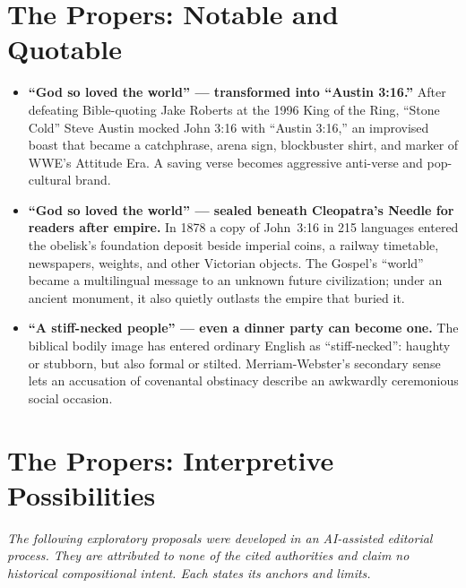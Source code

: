\section*{The Propers: Notable and Quotable}

{\small
\begin{itemize}[itemsep=0em,topsep=0.15em,parsep=0pt]
\item \textbf{“God so loved the world” --- transformed into “Austin 3:16.”\enspace{}} After defeating Bible-quoting Jake Roberts at the 1996 King of the Ring, “Stone Cold” Steve Austin mocked John 3:16 with “Austin 3:16,” an improvised boast that became a catchphrase, arena sign, blockbuster shirt, and marker of WWE's Attitude Era. A saving verse becomes aggressive anti-verse and pop-cultural brand.

\item \textbf{“God so loved the world” --- sealed beneath Cleopatra's Needle for readers after empire.\enspace{}} In 1878 a copy of John~3:16 in 215 languages entered the obelisk's foundation deposit beside imperial coins, a railway timetable, newspapers, weights, and other Victorian objects. The Gospel's “world” became a multilingual message to an unknown future civilization; under an ancient monument, it also quietly outlasts the empire that buried it.

\item \textbf{“A stiff-necked people” --- even a dinner party can become one.\enspace{}} The biblical bodily image has entered ordinary English as “stiff-necked”: haughty or stubborn, but also formal or stilted. Merriam-Webster's secondary sense lets an accusation of covenantal obstinacy describe an awkwardly ceremonious social occasion.
\end{itemize}
}

\section*{The Propers: Interpretive Possibilities}

\noindent\emph{The following exploratory proposals were developed in an AI-assisted editorial process. They are attributed to none of the cited authorities and claim no historical compositional intent. Each states its anchors and limits.}

